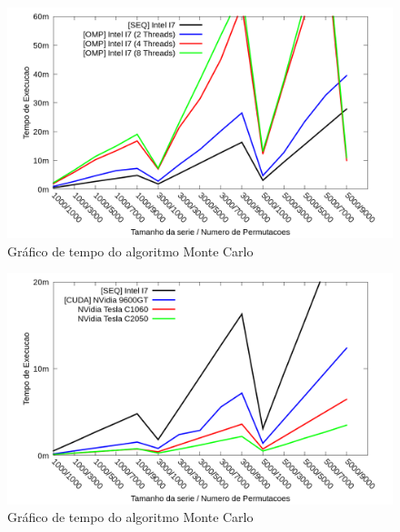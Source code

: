 \begin{figure}[H]
\centering
\includegraphics[width=1.0\textwidth]{Imagens/graficos_mcarlo/mcarlo_tempos_omp_threads.png}
\caption{Gráfico de tempo do algoritmo Monte Carlo}
\label{fig:grafico_speedup_mcarlo_omp_threads}
\end{figure}

\begin{figure}[H]
\centering
\includegraphics[width=1.0\textwidth]{Imagens/graficos_mcarlo/mcarlo_tempos_cuda.png}
\caption{Gráfico de tempo do algoritmo Monte Carlo}
\label{fig:grafico_tempo_mcarlo_cuda}
\end{figure}


